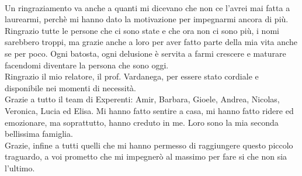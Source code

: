 {\\
Un ringraziamento va anche a quanti mi dicevano che non ce l'avrei mai fatta a laurearmi, perch\`e mi hanno dato la motivazione per impegnarmi ancora di pi\`u.
\\
Ringrazio tutte le persone che ci sono state e che ora non ci sono pi\`u, i nomi sarebbero troppi, ma grazie anche a loro per aver fatto parte della mia vita anche se per poco. Ogni batosta, ogni delusione \`e servita a farmi crescere e maturare facendomi diventare la persona che sono oggi.
\\
Ringrazio il mio relatore, il prof. Vardanega, per essere stato cordiale e disponibile nei momenti di necessità.
\\
Grazie a tutto il team di Experenti: Amir, Barbara, Gioele, Andrea, Nicolas, Veronica, Lucia ed Elisa. Mi hanno fatto sentire a casa, mi hanno fatto ridere ed emozionare, ma soprattutto, hanno creduto in me.
Loro sono la mia seconda bellissima famiglia.
\\
Grazie, infine a tutti quelli che mi hanno permesso di raggiungere questo piccolo traguardo, a voi prometto che mi impegner\`o al massimo per fare si che non sia l'ultimo.
}